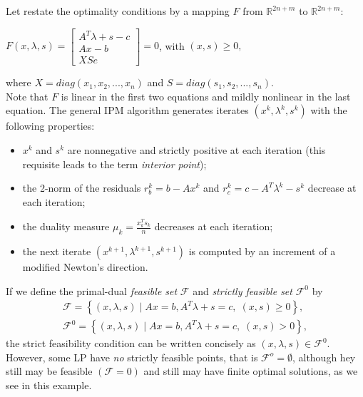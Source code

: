 \documentclass[a4paper,10 pt,titlepage,twoside]{book}
\theoremstyle{plain}
\theoremstyle{definition}
\theoremstyle{remark}
\begin{document}
 Let restate the optimality conditions by a mapping $\mathit{F}$ from $\mathbb{R}^{2n+m}$ to $\mathbb{R}^{2n+m}$:
\begin{center}\label{F}
	$\mathit{F}(x,\lambda,s)= \begin{bmatrix}
	A^{T}\lambda+s-c \\Ax-b \\XSe
	\end{bmatrix}=0$, with $(x,s)\geq0,$
\end{center}
where $X = diag(x_{1}, x_{2},...,x_{n})$ and $S = diag(s_{1}, s_{2},...,s_{n})$.\\
Note that $\mathit{F}$ is linear in the first two equations and mildly nonlinear in the last equation. 
The general IPM algorithm generates iterates $(x^{k},\lambda^{k},s^{k})$ with the following properties:
\begin{itemize}
	\item $x^{k}$ and $s^{k}$ are nonnegative and strictly positive at each iteration (this requisite leads to the term \textit{interior point});
	\item the 2-norm of the residuals $r_{b}^{k} = b - Ax^{k}$ and $r_{c}^{k} =c - A^{T}\lambda^{k} -s^{k}$ decrease at each iteration;
	\item the duality measure $\mu_{k} = \frac{x^{T}_{k}s_{k}}{n}$ decreases at each iteration;
	\item the next iterate $(x^{k+1},\lambda^{k+1},s^{k+1})$ is computed by an increment of a modified Newton's direction.
\end{itemize}
If we define the primal-dual \textit{feasible set} $\mathcal{F}$ and \textit{strictly feasible set} $\mathcal{F}^{0}$ by
\begin{align*}
\mathcal{F} = \left\lbrace(x,\lambda,s)\;|\;Ax = b, A^{T}\lambda+s =c,\;(x,s)\geq0\right\rbrace, \\
\mathcal{F}^{0} = \left\lbrace(x,\lambda,s)\;|\;Ax = b, A^{T}\lambda+s =c,\;(x,s)>0\right\rbrace, 
\end{align*}
the strict feasibility condition can be written concisely as $(x,\lambda,s)\in\mathcal{F}^{0}$.\\
However, some LP have \textit{no} strictly feasible points, that is $\mathcal{F}^{o}=\emptyset$, although hey still may be feasible $(\mathcal{F}=0)$ and still may have finite optimal solutions, as we see in this example.
\end{document}
